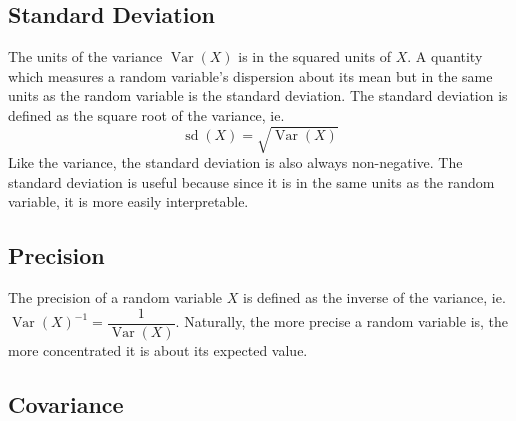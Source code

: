\documentclass[11pt]{report} %
\begin{document}
\subsection{Standard Deviation}

The units of the variance $\operatorname{Var}\left(X\right)$ is in the squared units of $X$. A quantity which measures a random variable's dispersion about its mean but in the same units as the random variable is the standard deviation. The standard deviation is defined as the square root of the variance, ie.
\begin{equation}
\operatorname{sd}\left(X\right) = \sqrt{\operatorname{Var}\left(X\right)}
\end{equation}
Like the variance, the standard deviation is also always non-negative. The standard deviation is useful because since it is in the same units as the random variable, it is more easily interpretable.

\subsection{Precision}

The precision of a random variable $X$ is defined as the inverse of the variance, ie. $\operatorname{Var}\left(X\right)^{-1} = \dfrac{1}{\operatorname{Var}\left(X\right)}$. Naturally, the more precise a random variable is, the more concentrated it is about its expected value.

\subsection{Covariance}
\end{document}
